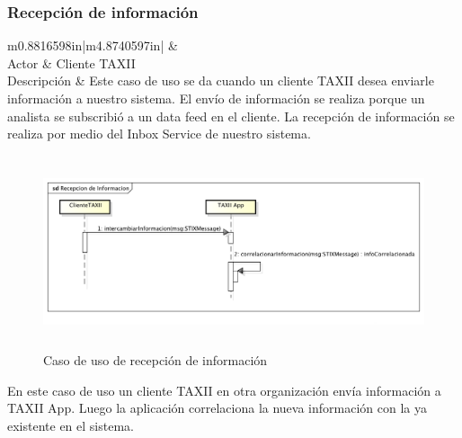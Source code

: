 \subsubsection{Recepción de información}
\begin{flushleft}
	\tablefirsthead{}
	\tablehead{}
	\tabletail{}
	\tablelasttail{}
	\begin{supertabular}{m{0.8816598in}|m{4.8740597in}|}
		 &
		\\\hline
		{ Actor} &
		{ Cliente TAXII}\\
		{ Descripción} &
		{ Este caso de uso se da cuando un cliente TAXII desea enviarle información a
			nuestro sistema. El envío de información se realiza porque un analista se subscribió a un data feed en el cliente. La
			recepción de información se realiza por medio del Inbox Service de nuestro sistema.}\\\hhline{~-}
	\end{supertabular}
\end{flushleft}
\begin{figure}[ht!]
	\centering
	\includegraphics[width=5.7638in,height=2.2256in]{Analisis22-img/Analisis22-img028.png} 
	\caption{Caso de uso de recepción de información}
	\label{fig.recepcioninfo}
\end{figure}

{
	En este caso de uso un cliente TAXII en otra organización envía información a TAXII App. Luego la aplicación
	correlaciona la nueva información con la ya existente en el sistema.}
\newpage
